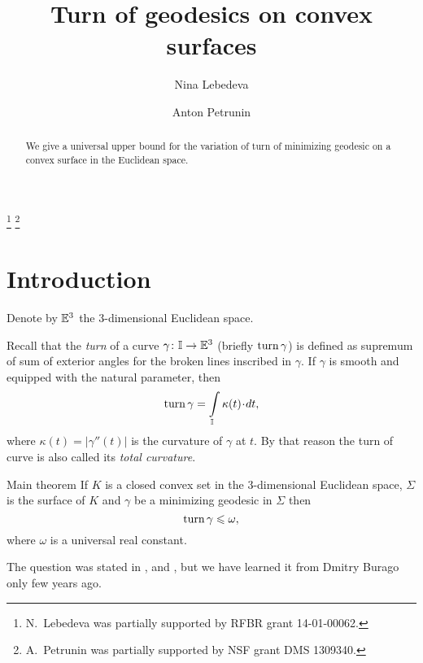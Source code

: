 \documentclass[a4paper,10pt]{amsart}
\begin{document}
\title{Turn of geodesics on convex surfaces}
\author{Nina Lebedeva}
\address{N. Lebedeva\newline\vskip-4mm
Math. Dept.
St. Petersburg State University,
Universitetsky pr., 28, 
Stary Peterhof, 
198504, Russia.
\newline\vskip-4mm
Steklov Institute,
27 Fontanka, St. Petersburg, 
191023, Russia.}
\author{Anton Petrunin}
\address{A. Petrunin\newline\vskip-4mm
Math. Dept. PSU,
University Park, PA 16802,
USA}
\thanks{N.~Lebedeva was partially supported by RFBR grant 
14-01-00062.}
\thanks{A.~Petrunin was partially supported by NSF grant DMS 1309340.}


\date{}

\begin{abstract}
We give a universal upper bound for the variation of turn of minimizing geodesic on a convex surface in the Euclidean space.
\end{abstract}
\maketitle


\section{Introduction}

Denote by $\mathbb{E}^3$ the 3-dimensional Euclidean space.

Recall that the \emph{turn} of a curve $\gamma\colon\mathbb{I}\to \mathbb{E}^3$ 
(briefly $\mathop{\rm turn}\nolimits\gamma$)
is defined as supremum of sum of exterior angles 
for the broken lines inscribed in $\gamma$.
If $\gamma$ is smooth and equipped with the natural parameter, 
then 
\[\turn\gamma=\int\limits_\II \kappa(t)\cdot dt,\]
where $\kappa(t)=|\gamma''(t)|$ is the curvature of $\gamma$ at $t$.
By that reason the turn of curve is also called its \emph{total curvature}.

\begin{thm}{Main theorem}\label{thm:main}
If $K$ is a closed convex set in the 3-dimensional Euclidean space,
$\Sigma$ is the surface of $K$ 
and $\gamma$ be a minimizing geodesic in $\Sigma$
then 
\[\mathop{\rm turn}\nolimits\gamma\leqslant \omega,\]
where $\omega$ is a universal real constant.
\end{thm}

The question was stated in \cite{AH-PSV}, \cite{pach} and \cite{BKZ},
but we have learned it from Dmitry Burago only few years ago.
\end{document}
